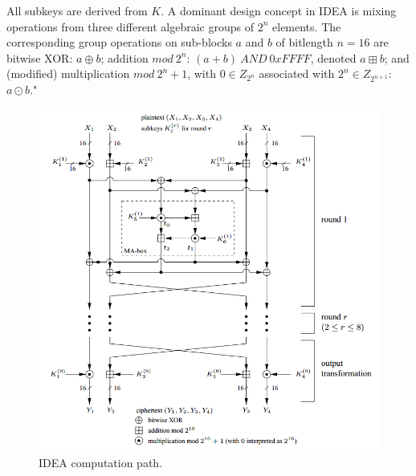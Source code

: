 \documentclass[a4paper,12pt,titlepage]{article}
\begin{document}
All subkeys are derived from $K$. A dominant design concept in IDEA is mixing operations from three different algebraic groups of $2^n$ elements. The corresponding group operations on sub-blocks $a$ and $b$ of bitlength $n = 16$ are bitwise XOR: $a \oplus b$; addition $mod\ 2^n$: $(a+b)\ AND\ 0xFFFF$, denoted $a \boxplus b$; and (modified) multiplication $mod\ 2^n+1$, with $0 \in Z_{2^n}$ associated with $2^n \in Z_{2^{n+1}}$:
$a \odot b$." \citep{menezes_handbook_1996}

\begin{figure}[!ht]
	\centering
	\label{fig:idea}
	\includegraphics[width=\textwidth]{idea.png}
	\caption{IDEA computation path. \citep{menezes_handbook_1996}}
\end{figure}


\newpage


\end{document}
